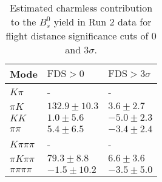 \begin{table}
  \centering
  \begin{tabular}{lll}
      \toprule
      Mode & $\mathrm{FDS} > 0$ & $\mathrm{FDS} > 3\sigma$ \\
      \midrule
      $K\pi$ & \-- & \-- \\
      $\pi K$ & $132.9 \pm 10.3$ & $3.6 \pm 2.7$ \\
      $KK$ & $1.0 \pm 5.6$ & $-5.0 \pm 2.3$ \\
      $\pi\pi$ & $5.4 \pm 6.5$ & $-3.4 \pm 2.4$ \\
      $K\pi\pi\pi$ & \-- & \-- \\
      $\pi K\pi\pi$ & $79.3 \pm 8.8$ & $6.6 \pm 3.6$ \\
      $\pi\pi\pi\pi$ & $-1.5 \pm 10.2$ & $-3.5 \pm 5.0$ \\
      \bottomrule
  \end{tabular}
  \caption{\small Estimated charmless contribution to the $B^{0}_{s}$ yield in Run 2 data for flight distance significance cuts of 0  and $3\sigma$.}
\label{tab:charmless_yields_Bs_run_2}
\end{table}
